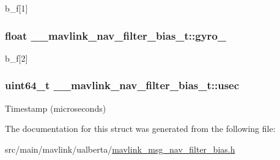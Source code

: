 b\+\_\+f\mbox{[}1\mbox{]} 

\hypertarget{struct____mavlink__nav__filter__bias__t_ab0f72a3646d3b2d3e3406ef09daed319}{
\subsubsection[{gyro\+\_\+2}]{\setlength{\rightskip}{0pt plus 5cm}float \+\_\+\+\_\+mavlink\+\_\+nav\+\_\+filter\+\_\+bias\+\_\+t\+::gyro\+\_}}\label{struct____mavlink__nav__filter__bias__t_ab0f72a3646d3b2d3e3406ef09daed319}


b\+\_\+f\mbox{[}2\mbox{]} 

\hypertarget{struct____mavlink__nav__filter__bias__t_aacc8bcbbd29fd2c5f4500c9d588e76a3}{
\subsubsection[{usec}]{\setlength{\rightskip}{0pt plus 5cm}uint64\+\_\+t \+\_\+\+\_\+mavlink\+\_\+nav\+\_\+filter\+\_\+bias\+\_\+t\+::usec}}\label{struct____mavlink__nav__filter__bias__t_aacc8bcbbd29fd2c5f4500c9d588e76a3}


Timestamp (microseconds) 



The documentation for this struct was generated from the following file\+:\begin{DoxyCompactItemize}
\item 
src/main/mavlink/ualberta/\hyperlink{mavlink__msg__nav__filter__bias_8h}{mavlink\+\_\+msg\+\_\+nav\+\_\+filter\+\_\+bias.\+h}\end{DoxyCompactItemize}
